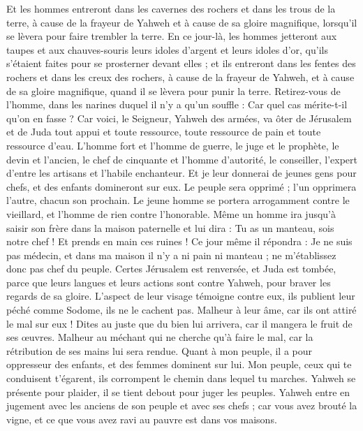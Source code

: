\begin{multicols}{2}
Et les hommes entreront dans les cavernes des rochers et dans les trous de la terre, à cause de la frayeur de Yahweh et à cause de sa gloire magnifique, lorsqu'il se lèvera pour faire trembler la terre.
En ce jour-là, les hommes jetteront aux taupes et aux chauves-souris leurs idoles d'argent et leurs idoles d'or, qu'ils s'étaient faites pour se prosterner devant elles ;
et ils entreront dans les fentes des rochers et dans les creux des rochers, à cause de la frayeur de Yahweh, et à cause de sa gloire magnifique, quand il se lèvera pour punir la terre.
Retirez-vous de l'homme, dans les narines duquel il n'y a qu'un souffle : Car quel cas mérite-t-il qu'on en fasse ?
\VerseOne{}Car voici, le Seigneur, Yahweh des armées, va ôter de Jérusalem et de Juda tout appui et toute ressource, toute ressource de pain et toute ressource d'eau.
L'homme fort et l'homme de guerre, le juge et le prophète, le devin et l'ancien,
le chef de cinquante et l'homme d'autorité, le conseiller, l'expert d'entre les artisans et l'habile enchanteur.
Et je leur donnerai de jeunes gens pour chefs, et des enfants domineront sur eux.
Le peuple sera opprimé ; l'un opprimera l'autre, chacun son prochain. Le jeune homme se portera arrogamment contre le vieillard, et l'homme de rien contre l'honorable.
Même un homme ira jusqu'à saisir son frère dans la maison paternelle et lui dira : Tu as un manteau, sois notre chef ! Et prends en main ces ruines !
Ce jour même il répondra : Je ne suis pas médecin, et dans ma maison il n'y a ni pain ni manteau ; ne m'établissez donc pas chef du peuple.
Certes Jérusalem est renversée, et Juda est tombée, parce que leurs langues et leurs actions sont contre Yahweh, pour braver les regards de sa gloire.
L'aspect de leur visage témoigne contre eux, ils publient leur péché comme Sodome, ils ne le cachent pas. Malheur à leur âme, car ils ont attiré le mal sur eux !
Dites au juste que du bien lui arrivera, car il mangera le fruit de ses œuvres.
Malheur au méchant qui ne cherche qu'à faire le mal, car la rétribution de ses mains lui sera rendue.
Quant à mon peuple, il a pour oppresseur des enfants, et des femmes dominent sur lui. Mon peuple, ceux qui te conduisent t'égarent, ils corrompent le chemin dans lequel tu marches.
Yahweh se présente pour plaider, il se tient debout pour juger les peuples.
Yahweh entre en jugement avec les anciens de son peuple et avec ses chefs ; car vous avez brouté la vigne, et ce que vous avez ravi au pauvre est dans vos maisons.

\end{multicols}
